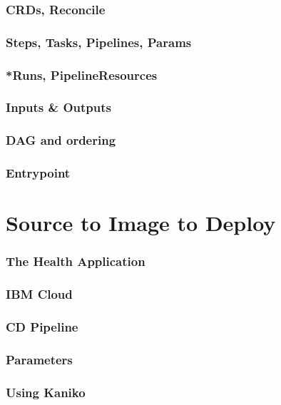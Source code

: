 \documentclass[aspectratio=169,11pt,hyperref={colorlinks=true}]{beamer}
\begin{document}
\begin{lblackrwhiteframe}
\begin{grayframe}
  \frametitle{CRDs, Reconcile}
\end{grayframe}

\begin{grayframe}
  \frametitle{Steps, Tasks, Pipelines, Params}
\end{grayframe}

\begin{grayframe}
  \frametitle{*Runs, PipelineResources}
\end{grayframe}

\begin{grayframe}
  \frametitle{Inputs \& Outputs}
\end{grayframe}

\begin{grayframe}
  \frametitle{DAG and ordering}
\end{grayframe}

\begin{grayframe}
  \frametitle{Entrypoint}
\end{grayframe}

\section{Source to Image to Deploy}

\begin{grayframe}
  \frametitle{The Health Application}
\end{grayframe}

\begin{grayframe}
  \frametitle{IBM Cloud}
\end{grayframe}

\begin{grayframe}
  \frametitle{CD Pipeline}
\end{grayframe}

\begin{grayframe}
  \frametitle{Parameters}
\end{grayframe}

\begin{grayframe}
  \frametitle{Using Kaniko}
\end{grayframe}


\end{lblackrwhiteframe}
\end{document}
